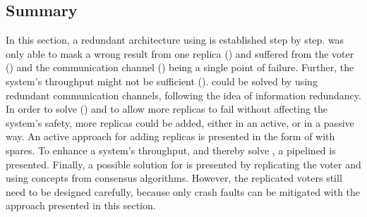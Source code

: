 \subsection{Summary}
In this section, a redundant architecture using  is established step by step.
 was only able to mask a wrong result from one replica (\ChallengeWR) and suffered from the voter (\ChallengeVoter) and the communication channel (\ChallengeComm) being a single point of failure.
Further, the system's throughput might not be sufficient (\ChallengeThrough).
\ChallengeComm could be solved by using redundant communication channels, following the idea of information redundancy.
In order to solve (\ChallengeWR) and to allow more replicas to fail without affecting the system's safety, more replicas could be added, either in an active, or in a passive way.
An active approach for adding replicas is presented in the form of  with spares.
To enhance a system's throughput, and thereby solve \ChallengeThrough, a pipelined  is presented.
Finally, a possible solution for \ChallengeVoter is presented by replicating the voter and using concepts from consensus algorithms.
However, the replicated voters still need to be designed carefully, because only crash faults can be mitigated with the approach presented in this section.
\\

